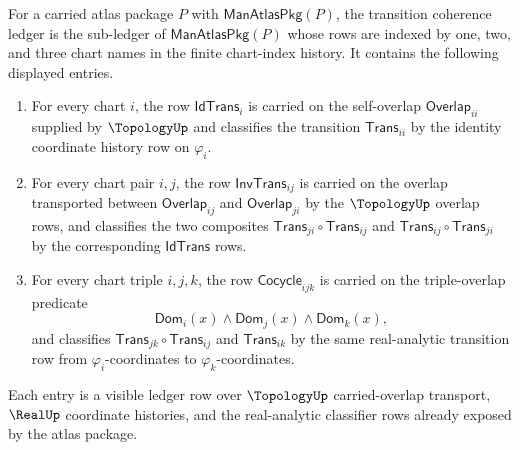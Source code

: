 \begin{definition}
\label{def:manifold-transition-coherence-ledger}
For a carried atlas package $P$ with $\mathsf{ManAtlasPkg}(P)$, the transition
coherence ledger is the sub-ledger of $\mathsf{ManAtlasPkg}(P)$ whose rows are
indexed by one, two, and three chart names in the finite chart-index history.
It contains the following displayed entries.
\begin{enumerate}
\item For every chart $i$, the row $\mathsf{IdTrans}_i$ is carried on the
self-overlap $\mathsf{Overlap}_{ii}$ supplied by $\TopologyUp$ and classifies
the transition $\mathsf{Trans}_{ii}$ by the identity coordinate history row on
$\varphi_i$.
\item For every chart pair $i,j$, the row $\mathsf{InvTrans}_{ij}$ is carried
on the overlap transported between $\mathsf{Overlap}_{ij}$ and
$\mathsf{Overlap}_{ji}$ by the $\TopologyUp$ overlap rows, and classifies the
two composites $\mathsf{Trans}_{ji}\circ\mathsf{Trans}_{ij}$ and
$\mathsf{Trans}_{ij}\circ\mathsf{Trans}_{ji}$ by the corresponding
$\mathsf{IdTrans}$ rows.
\item For every chart triple $i,j,k$, the row $\mathsf{Cocycle}_{ijk}$ is
carried on the triple-overlap predicate
$$
\mathsf{Dom}_i(x)\wedge\mathsf{Dom}_j(x)\wedge\mathsf{Dom}_k(x),
$$
and classifies $\mathsf{Trans}_{jk}\circ\mathsf{Trans}_{ij}$ and
$\mathsf{Trans}_{ik}$ by the same real-analytic transition row from
$\varphi_i$-coordinates to $\varphi_k$-coordinates.
\end{enumerate}
Each entry is a visible ledger row over $\TopologyUp$ carried-overlap
transport, $\RealUp$ coordinate histories, and the real-analytic classifier
rows already exposed by the atlas package.
\end{definition}

